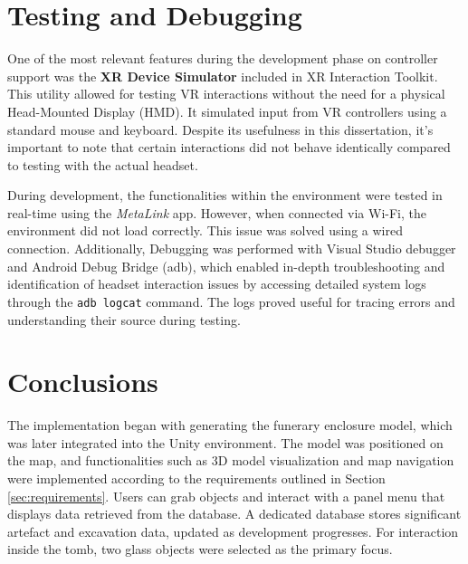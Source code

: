 \section{Testing and Debugging}
\label{sec:testing}

One of the most relevant features during the development phase on controller support was the \textbf{\gls{XR} Device Simulator} included in \gls{XR} Interaction Toolkit. 
This utility allowed for testing \gls{VR} interactions without the need for a physical Head-Mounted Display (\gls{HMD}). 
It simulated input from \gls{VR} controllers using a standard mouse and keyboard. 
Despite its usefulness in this dissertation, it's important to note that certain interactions did not behave identically compared to testing with the actual headset.

During development, the functionalities within the environment were tested in real-time using the \emph{MetaLink} app. However, when connected via Wi-Fi, the environment did not load correctly. This issue was solved using a wired connection.
Additionally, Debugging was performed with Visual Studio debugger and Android Debug Bridge (adb), which enabled in-depth troubleshooting and identification of headset interaction issues by accessing detailed system logs through the \texttt{adb logcat} command. The logs proved useful for tracing errors and understanding their source during testing.

\section{Conclusions}
\label{sec:impl_discussion}
The implementation began with generating the funerary enclosure model, which was later integrated into the Unity environment. The model was positioned on the map, and functionalities such as \gls{3D} model visualization and map navigation were implemented according to the requirements outlined in Section \ref{sec:requirements}. Users can grab objects and interact with a panel menu that displays data retrieved from the database. A dedicated database stores significant artefact and excavation data, updated as development progresses. 
For interaction inside the tomb, two glass objects were selected as the primary focus.

